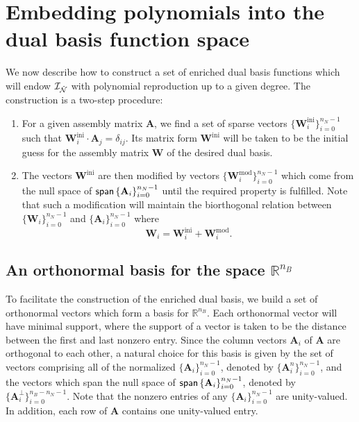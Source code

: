 \section{Embedding polynomials into the dual basis function space}\label{sec:algorithm}

We now describe how to construct a set of enriched dual basis functions which will endow $\mathcal{I}_{\hat{\mathcal{N}}}$ with polynomial reproduction up to a given degree. The construction is a two-step procedure:
\begin{enumerate}
\item For a given assembly matrix $\mathbf{A}$, we find a set of sparse vectors $\{\mathbf{W}^\text{ini}_i\}_{i=0}^{n_N-1}$ such that $\mathbf{W}^\text{ini}_i\cdot\mathbf{A}_j=\delta_{ij}$. Its matrix form $\mathbf{W}^\text{ini}$ will be taken to be the initial guess for the assembly matrix $\mathbf{W}$ of the desired dual basis.
  \item The vectors $\mathbf{W}^\text{ini}$ are then modified by vectors $\{\mathbf{W}^\text{mod}_i\}_{i=0}^{n_N-1}$ which come from the null space of $\operatorname{\mathsf{span}}\left\{\mathbf{A}_i\right\}_{i=0}^{n_N-1}$ until the required property is fulfilled. Note that such a modification will maintain the biorthogonal relation between $\{\mathbf{W}_i\}_{i=0}^{n_N-1}$ and $\{\mathbf{A}_i\}_{i=0}^{n_N-1}$ where
\begin{equation}
	\mathbf{W}_i=\mathbf{W}^\text{ini}_i+\mathbf{W}^\text{mod}_i.
\end{equation}
\end{enumerate}

\subsection{An orthonormal basis for the space $\mathbb{R}^{n_B}$}

To facilitate the construction of the enriched dual basis, we build a set of orthonormal vectors which form a basis for $\mathbb{R}^{n_B}$. Each orthonormal vector will have minimal support, where the support of a vector is taken to be the distance between the first and last nonzero entry. Since the column vectors $\mathbf{A}_i$ of $\mathbf{A}$ are orthogonal to each other, a natural choice for this basis is given by the set of vectors comprising all of the normalized $\{\mathbf{A}_i\}_{i=0}^{n_N-1}$, denoted by $\{\mathbf{A}^n_i\}_{i=0}^{n_N-1}$, and the vectors which span the null space of $\operatorname{\mathsf{span}}\left\{\mathbf{A}_i\right\}_{i=0}^{n_N-1}$, denoted by $\{\mathbf{A}^\perp_i\}_{i=0}^{n_B-n_N-1}$. Note that the nonzero entries of any $\{\mathbf{A}_i\}_{i=0}^{n_N-1}$ are unity-valued. In addition, each row of $\mathbf{A}$ contains one unity-valued entry.

